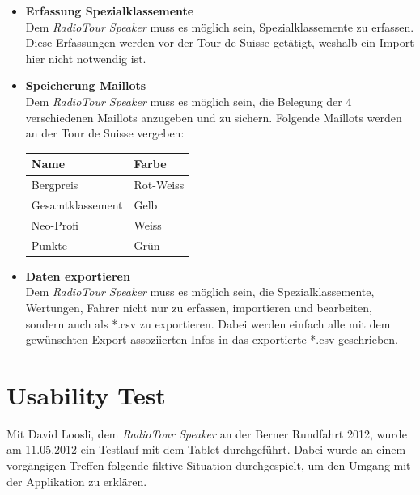 \begin{itemize}
\item \textbf{Erfassung Spezialklassemente}\\
Dem \textit{RadioTour Speaker} muss es möglich sein, Spezialklassemente zu erfassen. Diese Erfassungen werden vor der Tour de Suisse getätigt, weshalb ein Import hier nicht notwendig ist.

\item \textbf{Speicherung Maillots}\\
Dem \textit{RadioTour Speaker} muss es möglich sein, die Belegung der 4 verschiedenen Maillots anzugeben und zu sichern. Folgende Maillots werden an der Tour de Suisse vergeben:

\begin{center}
  \begin{tabular}{ l | l  }
    \hline
    Name & Farbe \\ \hline
    \hline
    Bergpreis & Rot-Weiss \\ \hline
    Gesamtklassement & Gelb \\ \hline
    Neo-Profi & Weiss \\ \hline
    Punkte & Grün\\

    \hline
  \end{tabular}
\end{center}


\item \textbf{Daten exportieren}\\
Dem \textit{RadioTour Speaker} muss es möglich sein, die Spezialklassemente, Wertungen, Fahrer nicht nur zu erfassen, importieren und bearbeiten, sondern auch als *.csv zu exportieren. Dabei werden einfach alle mit dem gewünschten Export assoziierten Infos in das exportierte *.csv geschrieben.

\end{itemize}

\section{Usability Test}
\label{ref:usability}
Mit David Loosli, dem \textit{RadioTour Speaker} an der Berner Rundfahrt 2012, wurde am 11.05.2012 ein Testlauf mit dem Tablet durchgeführt. Dabei wurde an einem vorgängigen Treffen folgende fiktive Situation durchgespielt, um den Umgang mit der Applikation zu erklären.

